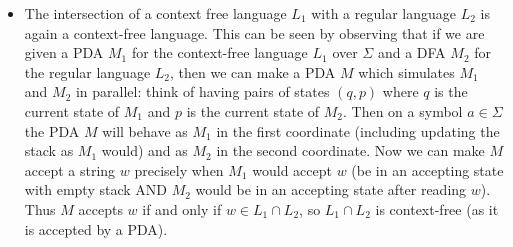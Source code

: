 \begin{itemize}
  \item The intersection of a context free language $L_{1}$ with a regular language $L_{2}$ is again a context-free language. This can be seen by observing that if we are given a PDA $M_{1}$ for the context-free language $L_{1}$ over $\Sigma$ and a DFA $M_{2}$ for the regular language $L_{2}$, then we can make a PDA $M$ which simulates $M_{1}$ and $M_{2}$ in parallel: think of having pairs of states $(q,p)$ where $q$ is the current state of $M_{1}$ and $p$ is the current state of $M_{2}$. Then on a symbol $a \in \Sigma$ the PDA $M$ will behave as $M_{1}$ in the first coordinate (including updating the stack as $M_{1}$ would) and as $M_2$ in the second coordinate. Now we can make $M$ accept a string $w$ precisely when $M_{1}$ would accept $w$ (be in an accepting state with empty stack AND $M_{2}$ would be in an accepting state after reading $w$). Thus $M$ accepts $w$ if and only if $w \in L_{1} \cap L_{2}$, so $L_{1} \cap L_{2}$ is context-free (as it is accepted by a PDA).

\end{itemize}

